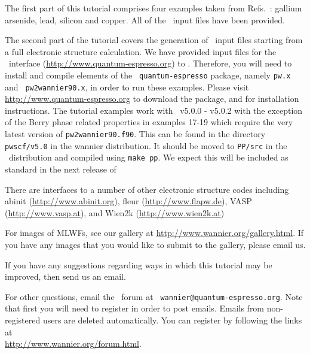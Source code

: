 \documentclass[a4paper,11pt,twoside]{article}
\begin{document}

The first part of this tutorial comprises four examples taken from
Refs.~\cite{marzari-prb97,souza-prb01}: gallium arsenide, lead,
silicon and copper. All of the \wannier\ input files have been
provided.

The second part of the tutorial covers the generation of \wannier\
input files starting from a full electronic structure calculation. We
have provided input files for the \pwscf\ interface (\url{http://www.quantum-espresso.org}) to \wannier. 
Therefore, you
will need to install and compile elements of the {\tt
  quantum-espresso} package, namely {\tt pw.x} and {\tt
  pw2wannier90.x}, in order to run these
examples. Please visit \url{http://www.quantum-espresso.org} to download the
package, and for installation instructions. 
The tutorial examples work with \pwscf\ v5.0.0 - v5.0.2 with the exception of the Berry phase related properties in examples 17-19 which require the
very latest version of {\tt pw2wannier90.f90}. This can be found in the directory {\tt pwscf/v5.0} in the wannier distribution. It should be moved to {\tt PP/src} in the \pwscf\ distribution and compiled using {\tt make pp}.
We expect this will be included as standard in the next release of \pwscf\


There are interfaces to a number of other electronic structure codes
including {\sc abinit} (\url{http://www.abinit.org}), {\sc fleur}
(\url{http://www.flapw.de}), {\sc VASP} (\url{http://www.vasp.at}), and
{\sc Wien2k} (\url{http://www.wien2k.at})

For images of MLWFs, see our gallery at
  \url{http://www.wannier.org/gallery.html}. If you have any images that
  you would like to submit to the gallery, please email us.


If you have any suggestions regarding ways in which this tutorial may
be improved, then send us an email.

For other questions, email the \wannier\ forum at {\tt
  wannier@quantum-espresso.org}.  Note that first you will need to
register in order to post emails. Emails from non-registered users are
deleted automatically. You can register by following the links at\\
\url{http://www.wannier.org/forum.html}.



\cleardoublepage
\end{document}
